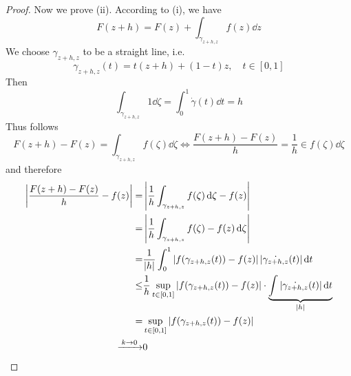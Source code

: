 \documentclass[../../script.tex]{subfiles}
\begin{document}
\begin{proof}
    Now we prove (ii). According to (i), we have 
    \begin{equation}
        F(z + h) = F(z) + \int_{\gamma_{z+h, z}} f(z) \dd{z}
    \end{equation}
    We choose $\gamma_{z+h, z}$ to be a straight line, i.e.
    \begin{equation}
        \gamma_{z+h, z}(t) = t(z + h) + (1 - t)z, \quad t \in [0, 1]
    \end{equation}
    Then
    \begin{equation}
        \int_{\gamma_{z+h, z}} 1 \dd{\zeta} = \int_0^1 \dot{\gamma}(t) \dd{t} = h
    \end{equation}
    Thus follows
    \begin{equation}
        F(z + h) - F(z) = \int_{\gamma_{z + h, z}} f(\zeta) \dd{\zeta} \iff \frac{F(z+h) - F(z)}{h} = \frac{1}{h} \in f(\zeta) \dd{\zeta} 
    \end{equation}
    and therefore 
    \begin{equation}
        \begin{split}
            \left| \frac{F(z+h) - F(z)}{h} - f(z) \right| = &\left| \frac{1}{h} \int_{\gamma_{z+h, z}} f(\zeta) \dd{\zeta} - f(z) \right| \\
            = &\left| \frac{1}{h} \int_{\gamma_{z+h, z}} f(\zeta) - f(z) \dd{\zeta} \right| \\
            = &\frac{1}{\abs{h}} \int_0^1 \left| f(\gamma_{z+h, z}(t)) - f(z)\right| \left| \dot{\gamma_{z+h, z}}(t) \right| \dd{t} \\
            \le &\frac{1}{h} \sup_{t \in [0, 1]} \left| f(\gamma_{z+h,z}(t)) - f(z) \right| \cdot \underbrace{\int \left| \dot{\gamma_{z+h, z}}(t) \right| \dd{t}}_{\abs{h}} \\
            = &\sup_{t \in [0, 1]} \left| f(\gamma_{z+h, z}(t)) - f(z) \right| \\
            \conv{k \rightarrow 0} &0
        \end{split}
    \end{equation}
\end{proof}
\end{document}
